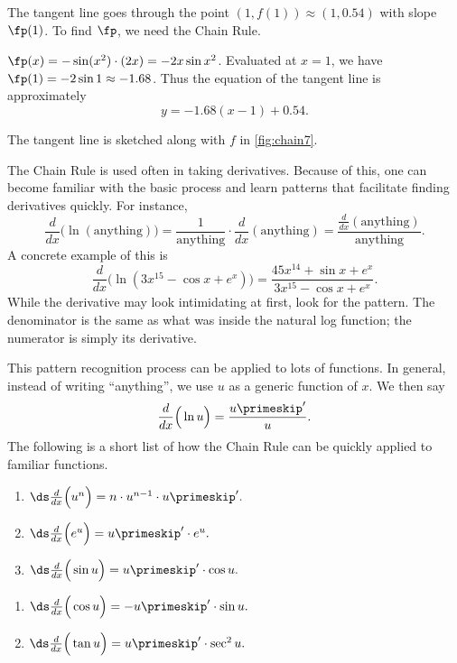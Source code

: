 {The tangent line goes through the point $(1,f(1)) \approx (1,0.54)$ with slope $\fp(1)$. To find $\fp$, we need the Chain Rule.

$\fp(x) = -\sin(x^2) \cdot(2x) = -2x\sin x^2$. Evaluated at $x=1$, we have $\fp(1) = -2\sin 1\approx -1.68$. Thus the equation of the tangent line is approximately
\[y = -1.68(x-1)+0.54.\]

The tangent line is sketched along with $f$ in \autoref{fig:chain7}.}

The Chain Rule is used often in taking derivatives. Because of this, one can become familiar with the basic process and learn  patterns that facilitate finding derivatives quickly. For instance,
\[
 \frac{d}{dx}\Big(\ln (\text{anything})\Big)
 = \frac{1}{\text{anything}}\cdot\frac{d}{dx}(\text{anything})
 = \frac{\frac{d}{dx}(\text{anything})}{\text{anything}}.
\]
A concrete example of this is
\[
\frac{d}{dx}\Big(\ln(3x^{15}-\cos x+e^x)\Big)
= \frac{45x^{14}+\sin x+e^x}{3x^{15}-\cos x+e^x}.
\]
While the derivative may  look intimidating at first, look for the pattern. The denominator is the same as what was inside the natural log function; the  numerator is simply its derivative.

This pattern recognition process can be applied to lots of functions. In general, instead of writing ``anything'', we use $u$ as a generic function of $x$. We then say \[\frac{d}{dx}\Big(\ln u\Big) = \frac{u\primeskip'}{u}.\]
The following is a short list of how the Chain Rule can be quickly applied to familiar functions.

\noindent\begin{minipage}[t]{.5\textwidth}
\begin{enumerate}
	\item	$\ds\frac{d}{dx}\Big(u^n\Big) = n\cdot u^{n-1}\cdot u\primeskip'.$
	\item	$\ds\frac{d}{dx}\Big(e^u\Big) = u\primeskip'\cdot e^u.$
	\item	$\ds\frac{d}{dx}\Big(\sin u\Big) = u\primeskip'\cdot \cos u.$
\end{enumerate}
\end{minipage}%
\begin{minipage}[t]{.5\textwidth}
\begin{enumerate}\addtocounter{enumi}{3}
	\item	$\ds\frac{d}{dx}\Big(\cos u\Big) = -u\primeskip'\cdot \sin u.$
	\item	$\ds\frac{d}{dx}\Big(\tan u\Big) = u\primeskip'\cdot \sec^2 u.$
\end{enumerate}
\end{minipage}\bigskip

